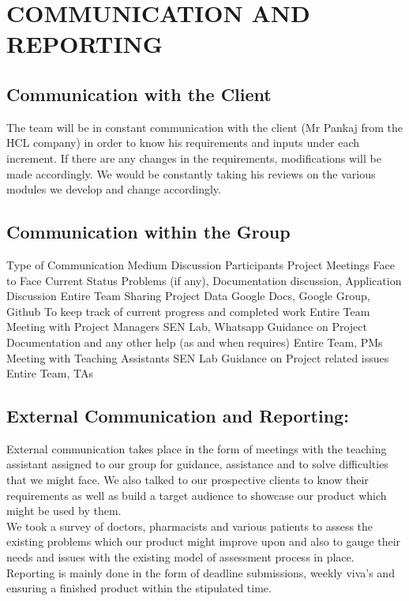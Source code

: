 \documentclass[
10pt, %
a4paper, %
oneside, %
headinclude,footinclude, %
BCOR5mm, %
]{scrartcl}
\begin{document}
\section{ COMMUNICATION AND REPORTING}
\subsection{ Communication with the Client}
The team will be in constant communication with the client (Mr Pankaj from the HCL company) in order to know his requirements and inputs under each increment. If there are any changes in the requirements, modiﬁcations will be made accordingly. We would be constantly taking his reviews on the various modules we develop and change accordingly.

\subsection{ Communication within the Group}
Type of Communication
Medium Discussion Participants
Project Meetings Face to Face
Current Status Problems (if any), Documentation discussion, Application Discussion
Entire Team
Sharing Project Data
Google Docs, Google Group, Github
To keep track of current progress and completed work
Entire Team
Meeting with Project Managers
SEN Lab, Whatsapp
Guidance on Project Documentation and any other help (as and when requires)
Entire Team, PMs
Meeting with Teaching Assistants
SEN Lab
Guidance on Project related issues
Entire Team, TAs

\subsection{External Communication and Reporting:}

External communication takes place in the form of  meetings with the teaching assistant assigned to our group for guidance, assistance and to solve difficulties that we might face. We also talked to our prospective clients to know their requirements as well as build a target audience to showcase our product which might be used by them.\vspace{0.5cm}
\\We took a survey of doctors, pharmacists and various patients  to assess the existing problems which our product might improve upon and also to gauge their needs and issues with the existing model of assessment process in place.
\vspace{1cm}
\\Reporting is mainly done in the form of deadline submissions, weekly viva’s and ensuring a finished product within the stipulated time.
\end{document}
